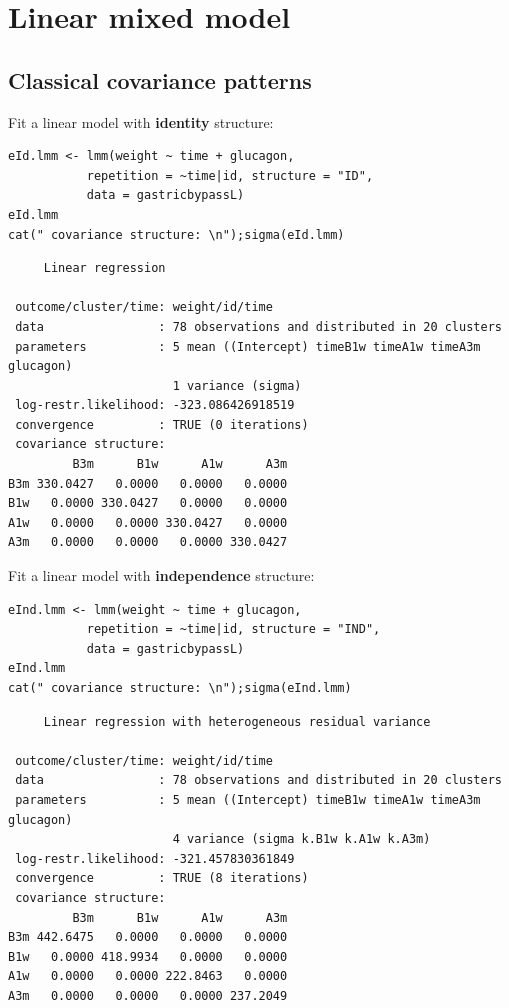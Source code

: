 \documentclass[12pt]{article}
\begin{document}
\clearpage

\section{Linear mixed model}
\label{sec:org0188aab}
\subsection{Classical covariance patterns}
\label{sec:org9e049f0}
Fit a linear model with \textbf{identity} structure:
\lstset{language=r,label= ,caption= ,captionpos=b,numbers=none}
\begin{lstlisting}
eId.lmm <- lmm(weight ~ time + glucagon,
	       repetition = ~time|id, structure = "ID",
	       data = gastricbypassL)
eId.lmm
cat(" covariance structure: \n");sigma(eId.lmm)
\end{lstlisting}

\begin{verbatim}
     Linear regression 

 outcome/cluster/time: weight/id/time 
 data                : 78 observations and distributed in 20 clusters 
 parameters          : 5 mean ((Intercept) timeB1w timeA1w timeA3m glucagon) 
                       1 variance (sigma) 
 log-restr.likelihood: -323.086426918519 
 convergence         : TRUE (0 iterations)
 covariance structure: 
         B3m      B1w      A1w      A3m
B3m 330.0427   0.0000   0.0000   0.0000
B1w   0.0000 330.0427   0.0000   0.0000
A1w   0.0000   0.0000 330.0427   0.0000
A3m   0.0000   0.0000   0.0000 330.0427
\end{verbatim}

Fit a linear model with \textbf{independence} structure:
\lstset{language=r,label= ,caption= ,captionpos=b,numbers=none}
\begin{lstlisting}
eInd.lmm <- lmm(weight ~ time + glucagon,
	       repetition = ~time|id, structure = "IND",
	       data = gastricbypassL)
eInd.lmm
cat(" covariance structure: \n");sigma(eInd.lmm)
\end{lstlisting}

\begin{verbatim}
     Linear regression with heterogeneous residual variance 

 outcome/cluster/time: weight/id/time 
 data                : 78 observations and distributed in 20 clusters 
 parameters          : 5 mean ((Intercept) timeB1w timeA1w timeA3m glucagon) 
                       4 variance (sigma k.B1w k.A1w k.A3m) 
 log-restr.likelihood: -321.457830361849 
 convergence         : TRUE (8 iterations)
 covariance structure: 
         B3m      B1w      A1w      A3m
B3m 442.6475   0.0000   0.0000   0.0000
B1w   0.0000 418.9934   0.0000   0.0000
A1w   0.0000   0.0000 222.8463   0.0000
A3m   0.0000   0.0000   0.0000 237.2049
\end{verbatim}
\end{document}
